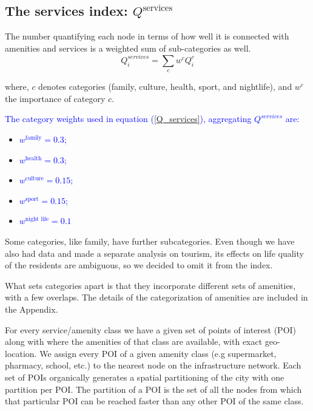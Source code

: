 \subsection{The services index: \texorpdfstring{$Q^{\text{services}}$}{Q\^services}}
The number quantifying each node in terms of how well it is connected with amenities and services is a weighted sum of sub-categories as well.
\begin{equation}\label{Q_services}
	Q_i^{services} =\sum_c w^c Q_i^c
\end{equation}

where, $c$ denotes categories (family, culture, health, sport, and nightlife), and $w^c$ the importance of category $c$. %

\textcolor{blue}{The category weights used in equation (\ref{Q_services}), aggregating $Q^{services}$ are:}

\begin{itemize}
  \item \textcolor{blue}{$w^{\text{family}}= 0.3$;}
  \item \textcolor{blue}{$w^{\text{health}}= 0.3$;}
  \item \textcolor{blue}{$w^{\text{culture}} = 0.15$;}
  \item \textcolor{blue}{$w^{\text{sport}} = 0.15$;}
  \item \textcolor{blue}{$w^{\text{night life}}=0.1$}
\end{itemize}

Some categories, like family, have further subcategories. Even though we have also had data and made a separate analysis on tourism, its effects on life quality of the residents are ambiguous, so we decided to omit it from the index.

What sets categories apart is that they incorporate different sets of amenities, with a few overlaps. The details of the categorization of amenities are included in the Appendix.

For every service/amenity class we have a given set of points of interest (POI) along with where the amenities of that class are available, with exact geo-location. We assign every POI of a given amenity class (e.g supermarket, pharmacy, school, etc.) to the nearest node on the infrastructure network. Each set of POIs organically generates a spatial partitioning of the city with one partition per POI. The partition of a POI is the set of all the nodes from which that particular POI can be reached faster than any other POI of the same class.

